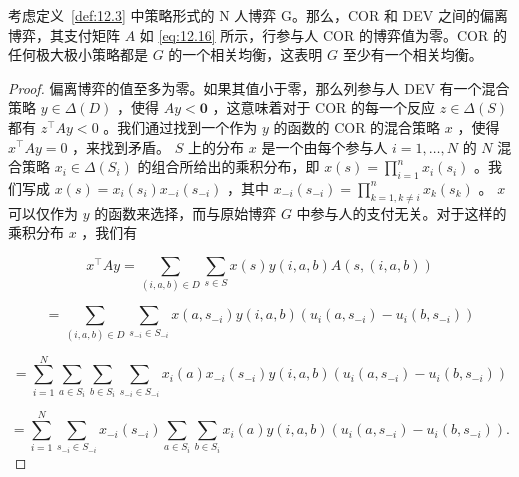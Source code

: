 \begin{theorem}\label{theo:12.11}
考虑定义~\ref{def:12.3} 中策略形式的 N 人博弈 G。那么，COR 和 DEV 之间的偏离博弈，其支付矩阵 \(A\) 如 \eqref{eq:12.16} 所示，行参与人 COR 的博弈值为零。COR 的任何极大极小策略都是 \(G\) 的一个相关均衡，这表明 \(G\) 至少有一个相关均衡。
\end{theorem}


\begin{proof}
偏离博弈的值至多为零。如果其值小于零，那么列参与人 DEV 有一个混合策略 \(y \in  \Delta \left( D\right)\) ，使得 \({Ay} < \bm{0}\) ，这意味着对于 COR 的每一个反应 \(z \in  \Delta \left( S\right)\) 都有 \({z}^{\top }{Ay} < 0\) 。我们通过找到一个作为 \(y\) 的函数的 COR 的混合策略 \(x\) ，使得 \({x}^{\top }{Ay} = 0\) ，来找到矛盾。 \(S\) 上的分布 \(x\) 是一个由每个参与人 \(i = 1,\ldots ,N\) 的 \(N\) 混合策略 \({x}_{i} \in  \Delta \left( {S}_{i}\right)\) 的组合所给出的乘积分布，即 \(x\left( s\right)  = \mathop{\prod }\limits_{{i = 1}}^{n}{x}_{i}\left( {s}_{i}\right)\) 。我们写成 \(x\left( s\right)  = {x}_{i}\left( {s}_{i}\right) {x}_{-i}\left( {s}_{-i}\right)\) ，其中 \({x}_{-i}\left( {s}_{-i}\right)  = \mathop{\prod }\limits_{{k = 1,k \neq  i}}^{n}{x}_{k}\left( {s}_{k}\right)\) 。 \(x\) 可以仅作为 \(y\) 的函数来选择，而与原始博弈 \(G\) 中参与人的支付无关。对于这样的乘积分布 \(x\) ，我们有

\[
{x}^{\top }{Ay} = \mathop{\sum }\limits_{{\left( {i,a,b}\right)  \in  D}}\mathop{\sum }\limits_{{s \in  S}}x\left( s\right) y\left( {i,a,b}\right) A\left( {s,\left( {i,a,b}\right) }\right)
\]

\[
= \mathop{\sum }\limits_{{\left( {i,a,b}\right)  \in  D}}\mathop{\sum }\limits_{{{s}_{-i} \in  {S}_{-i}}}x\left( {a,{s}_{-i}}\right) y\left( {i,a,b}\right) \left( {{u}_{i}\left( {a,{s}_{-i}}\right)  - {u}_{i}\left( {b,{s}_{-i}}\right) }\right)
\]

\[
= \mathop{\sum }\limits_{{i = 1}}^{N}\mathop{\sum }\limits_{{a \in  {S}_{i}}}\mathop{\sum }\limits_{{b \in  {S}_{i}}}\mathop{\sum }\limits_{{{s}_{-i} \in  {S}_{-i}}}{x}_{i}\left( a\right) {x}_{-i}\left( {s}_{-i}\right) y\left( {i,a,b}\right) \left( {{u}_{i}\left( {a,{s}_{-i}}\right)  - {u}_{i}\left( {b,{s}_{-i}}\right) }\right)
\]

\begin{equation}
= \mathop{\sum }\limits_{{i = 1}}^{N}\mathop{\sum }\limits_{{{s}_{-i} \in  {S}_{-i}}}{x}_{-i}\left( {s}_{-i}\right) \mathop{\sum }\limits_{{a \in  {S}_{i}}}\mathop{\sum }\limits_{{b \in  {S}_{i}}}{x}_{i}\left( a\right) y\left( {i,a,b}\right) \left( {{u}_{i}\left( {a,{s}_{-i}}\right)  - {u}_{i}\left( {b,{s}_{-i}}\right) }\right) . \label{eq:12.18}
\end{equation}



\end{proof}
